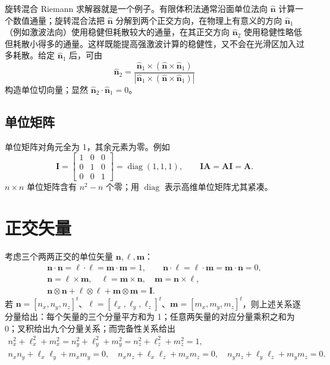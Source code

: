 \documentclass[11pt,a4paper,openany,fontset=none]{ctexbook}
\begin{document}
旋转混合 Riemann 求解器就是一个例子。有限体积法通常沿面单位法向 $\hat{\bm n}$ 计算一个数值通量；旋转混合法把 $\hat{\bm n}$ 分解到两个正交方向，在物理上有意义的方向 $\hat{\bm n}_1$（例如激波法向）使用稳健但耗散较大的通量，在其正交方向 $\hat{\bm n}_2$ 使用稳健性略低但耗散小得多的通量。这样既能提高强激波计算的稳健性，又不会在光滑区加入过多耗散。给定 $\hat{\bm n}_1$ 后，可由
\begin{equation}
 \hat{\bm n}_2=\frac{\hat{\bm n}_1\times(\hat{\bm n}\times\hat{\bm n}_1)}
 {|\hat{\bm n}_1\times(\hat{\bm n}\times\hat{\bm n}_1)|} \tag{1.2.26}
\end{equation}
构造单位切向量；显然 $\hat{\bm n}_2\cdot\hat{\bm n}_1=0$。

\subsection{单位矩阵}

单位矩阵对角元全为 1，其余元素为零。例如
\begin{equation}
 \bm I=\begin{bmatrix}1&0&0\\0&1&0\\0&0&1\end{bmatrix}=\operatorname{diag}(1,1,1),\qquad
 \bm I\bm A=\bm A\bm I=\bm A. \tag{1.2.27--29}
\end{equation}
$n\times n$ 单位矩阵含有 $n^2-n$ 个零；用 $\operatorname{diag}$ 表示高维单位矩阵尤其紧凑。

\section{正交矢量}

考虑三个两两正交的单位矢量 $\bm n,\bm\ell,\bm m$：
\begin{gather}
 \bm n\cdot\bm n=\bm\ell\cdot\bm\ell=\bm m\cdot\bm m=1,\qquad
 \bm n\cdot\bm\ell=\bm\ell\cdot\bm m=\bm m\cdot\bm n=0, \tag{1.3.1--2}\\
 \bm n=\bm\ell\times\bm m,\quad \bm\ell=\bm m\times\bm n,\quad \bm m=\bm n\times\bm\ell, \tag{1.3.3--5}\\
 \bm n\otimes\bm n+\bm\ell\otimes\bm\ell+\bm m\otimes\bm m=\bm I. \tag{1.3.6}
\end{gather}
若 $\bm n=[n_x,n_y,n_z]^t$、$\bm\ell=[\ell_x,\ell_y,\ell_z]^t$、$\bm m=[m_x,m_y,m_z]^t$，则上述关系逐分量给出：每个矢量的三个分量平方和为 1；任意两矢量的对应分量乘积之和为 0；叉积给出九个分量关系；而完备性关系给出
\begin{gather}
 n_x^2+\ell_x^2+m_x^2=n_y^2+\ell_y^2+m_y^2=n_z^2+\ell_z^2+m_z^2=1,\\
 n_xn_y+\ell_x\ell_y+m_xm_y=0,\quad
 n_xn_z+\ell_x\ell_z+m_xm_z=0,\quad
 n_yn_z+\ell_y\ell_z+m_ym_z=0. \tag{1.3.14--19}
\end{gather}
\end{document}
